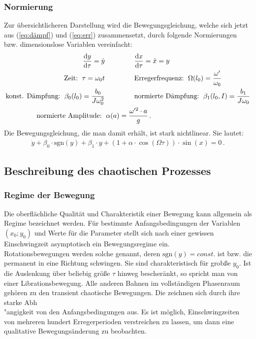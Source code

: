 \documentclass[numbers=noenddot,12pt,a4paper]{scrartcl}
\newcommand{\diff}{\textnormal{d}}
\newcommand{\sgn}[1]{\text{sgn}\left(#1\right)}
\begin{document}
\subsubsection{Normierung}
Zur übersichtlicheren Darstellung wird die Bewegungsgleichung, welche sich jetzt aus (\ref{eq:dämpf}) und (\ref{eq:err}) zusammensetzt, durch folgende Normierungen bzw. dimensionslose Variablen vereinfacht:
\begin{align}
\frac{\diff y}{\diff \tau}=\dot y &\hspace{1.5cm} \frac{\diff x}{\diff \tau}=\dot x=y\\
\text{Zeit: } \, \tau=\omega_0 t &\hspace{1.5cm} \text{Erregerfrequenz: } \, \Omega(l_0)=\frac{\omega^\prime}{\omega_0} \\
\text{konst. Dämpfung: } \, \beta_0(l_0)=\frac{b_0}{J\omega_0^2} &\hspace{1.5cm} \text{normierte Dämpfung: } \, \beta_1(l_0, I)=\frac{b_1}{J\omega_0} \\
\text{normierte Amplitude: }& \, \alpha(a)=\frac{\omega^{\prime 2}\cdot a}{g} \, .
\end{align}
Die Bewegungsgleichung, die man damit erhält, ist stark nichtlinear. Sie lautet:
\begin{align}
\dot y+\beta_0\cdot\sgn{y}+\beta_1\cdot y+ \left(1+\alpha\cdot\cos\left(\Omega \tau\right)\right)\cdot\sin\left(x\right)=0 \, .
\end{align}
\subsection{Beschreibung des chaotischen Prozesses}
\subsubsection{Regime der Bewegung}
Die oberfl\"achliche Qualit\"at und Charakteristik einer Bewegung kann allgemein als Regime bezeichnet werden. F\"ur bestimmte Anfangsbedingungen der Variablen $\left(x_{0};y_0\right)$ und Werte f\"ur die Parameter stellt sich nach einer gewissen Einschwingzeit asymptotisch ein Bewegungsregime ein.\\
Rotationsbewegungen werden solche genannt, deren $\sgn{y}=const.$ ist bzw. die permanent in eine Richtung schwingen. Sie sind charakteristisch f\"ur grob{\ss}e $y_0$. Ist die Auslenkung \"uber beliebig gr\"o{\ss}e $\tau$ hinweg bescher\"ankt, so spricht man von einer Librationsbewegung. Alle anderen Bahnen im vollst\"andigen Phasenraum geh\"oren zu den transient chaotische Bewegungen. Die zeichnen sich durch ihre starke Abh\\"angigkeit von den Anfangsbedingungen aus. Es ist m\"oglich, Einschwingzeiten von mehreren hundert Erregerperioden verstreichen zu lassen, um dann eine qualitative Bewegungs\"anderung zu beobachten.
\end{document}
